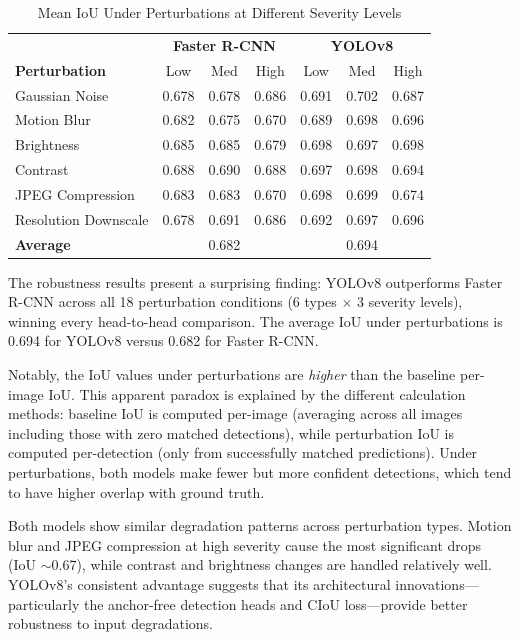 \documentclass[conference]{IEEEtran}
\begin{document}
\begin{table}[h]
\centering
\caption{Mean IoU Under Perturbations at Different Severity Levels}
\label{tab:robustness}
\begin{tabular}{lccc|ccc}
\toprule
& \multicolumn{3}{c}{\textbf{Faster R-CNN}} & \multicolumn{3}{c}{\textbf{YOLOv8}} \\
\textbf{Perturbation} & Low & Med & High & Low & Med & High \\
\midrule
Gaussian Noise & 0.678 & 0.678 & 0.686 & 0.691 & 0.702 & 0.687 \\
Motion Blur & 0.682 & 0.675 & 0.670 & 0.689 & 0.698 & 0.696 \\
Brightness & 0.685 & 0.685 & 0.679 & 0.698 & 0.697 & 0.698 \\
Contrast & 0.688 & 0.690 & 0.688 & 0.697 & 0.698 & 0.694 \\
JPEG Compression & 0.683 & 0.683 & 0.670 & 0.698 & 0.699 & 0.674 \\
Resolution Downscale & 0.678 & 0.691 & 0.686 & 0.692 & 0.697 & 0.696 \\
\midrule
\textbf{Average} & \multicolumn{3}{c}{0.682} & \multicolumn{3}{c}{0.694} \\
\bottomrule
\end{tabular}
\end{table}

The robustness results present a surprising finding: YOLOv8 outperforms Faster R-CNN across all 18 perturbation conditions (6 types $\times$ 3 severity levels), winning every head-to-head comparison. The average IoU under perturbations is 0.694 for YOLOv8 versus 0.682 for Faster R-CNN.

Notably, the IoU values under perturbations are \textit{higher} than the baseline per-image IoU. This apparent paradox is explained by the different calculation methods: baseline IoU is computed per-image (averaging across all images including those with zero matched detections), while perturbation IoU is computed per-detection (only from successfully matched predictions). Under perturbations, both models make fewer but more confident detections, which tend to have higher overlap with ground truth.

Both models show similar degradation patterns across perturbation types. Motion blur and JPEG compression at high severity cause the most significant drops (IoU $\sim$0.67), while contrast and brightness changes are handled relatively well. YOLOv8's consistent advantage suggests that its architectural innovations---particularly the anchor-free detection heads and CIoU loss---provide better robustness to input degradations.
\end{document}
